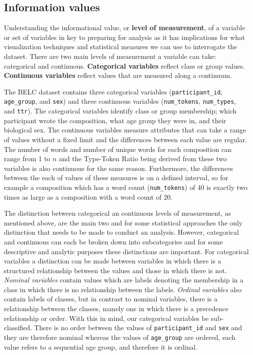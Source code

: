 \documentclass[
  letterpaper,
]{latex/krantz}
\begin{document}
\hypertarget{information-values}{%
\subsection{Information values}\label{information-values}}

Understanding the informational value, or \textbf{level of measurement},
of a variable or set of variables in key to preparing for analysis as it
has implications for what visualization techniques and statistical
measures we can use to interrogate the dataset. There are two main
levels of measurement a variable can take: categorical and continuous.
\textbf{Categorical variables} reflect class or group values.
\textbf{Continuous variables} reflect values that are measured along a
continuum.

The BELC dataset contains three categorical variables
(\texttt{participant\_id}, \texttt{age\_group}, and \texttt{sex}) and
three continuous variables (\texttt{num\_tokens}, \texttt{num\_types},
and \texttt{ttr}). The categorical variables identify class or group
membership; which participant wrote the composition, what age group they
were in, and their biological sex. The continuous variables measure
attributes that can take a range of values without a fixed limit and the
differences between each value are regular. The number of words and
number of unique words for each composition can range from 1 to \(n\)
and the Type-Token Ratio being derived from these two variables is also
continuous for the same reason. Furthermore, the differences between the
each of values of these measures is on a defined interval, so for
example a composition which has a word count (\texttt{num\_tokens}) of
40 is exactly two times as large as a composition with a word count of
20.

The distinction between categorical an continuous levels of measurement,
as mentioned above, are the main two and for some statistical approaches
the only distinction that needs to be made to conduct an analysis.
However, categorical and continuous can each be broken down into
subcategories and for some descriptive and analytic purposes these
distinctions are important. For categorical variables a distinction can
be made between variables in which there is a structured relationship
between the values and those in which there is not. \emph{Nominal
variables} contain values which are labels denoting the membership in a
class in which there is no relationship between the labels.
\emph{Ordinal variables} also contain labels of classes, but in contrast
to nominal variables, there is a relationship between the classes,
namely one in which there is a precedence relationship or order. With
this in mind, our categorical variables be sub-classified. There is no
order between the values of \texttt{participant\_id} and \texttt{sex}
and they are therefore nominal whereas the values of \texttt{age\_group}
are ordered, each value refers to a sequential age group, and therefore
it is ordinal.
\end{document}
